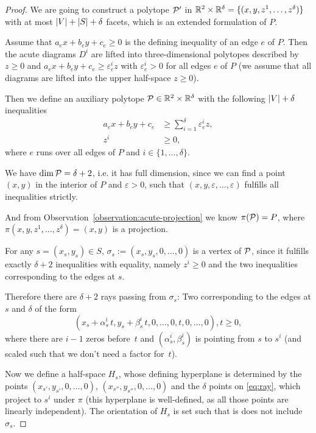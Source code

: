 \begin{proof}
  We are going to construct a polytope $\P'$ in $\R^2 \times \R^{\delta} = \{(x,y,z^1,\dots,z^{\delta})\}$ with at most $\abs{V}+\abs{S}+\delta$ facets, which is an extended formulation of $P$.

  Assume that $a_e x + b_e y + c_e \geq 0$ is the defining inequality of an edge $e$ of $P$. Then the acute diagrams $D^i$ are lifted into three-dimensional polytopes described by $z \geq 0$ and $a_e x + b_e y + c_e \geq \varepsilon_e^i z$ with $\varepsilon_e^i > 0$ for all edges $e$ of $P$ (we assume that all diagrams are lifted into the upper half-space $z \geq 0$).

  Then we define an auxiliary polytope $\P \in \R^2 \times \R^{\delta}$ with the following $\abs{V}+\delta$ inequalities 
  \begin{align*}
    a_e x + b_e y + c_e &\geq \sum_{i=1}^{\delta} \varepsilon_e^i z,\\
    z^i &\geq 0,
  \end{align*}
  where $e$ runs over all edges of $P$ and $i \in \{1,\dots,\delta\}$.

  We have $\dim \P = \delta + 2$, i.e. it has full dimension, since we can find a point $(x,y)$ in the interior of $P$ and $\varepsilon > 0$, such that $(x,y,\varepsilon,\dots,\varepsilon)$ fulfills all inequalities strictly.

  And from Observation~\ref{observation:acute-projection} we know $\pi(\P)=P$, where $\pi(x,y,z^1,\dots,z^{\delta}) = (x,y)$ is a projection.

  For any $s = (x_s, y_s) \in S$, $\sigma_s := (x_s,y_s,0,\dots,0)$ is a vertex of $\P$, since it fulfills exactly $\delta + 2$ inequalities with equality, namely $z^i \geq 0$ and the two inequalities corresponding to the edges at $s$.

  Therefore there are $\delta + 2$ rays passing from $\sigma_s$: Two corresponding to the edges at $s$ and $\delta$ of the form
  \begin{equation}\label{eq:ray}
    (x_s + \alpha_s^i\,t,y_s + \beta_s^i\,t,0,\dots,0,t,0,\dots,0), t \geq 0,
  \end{equation}
  where there are $i-1$ zeros before~$t$ and $(\alpha_s^i, \beta_s^i)$ is pointing from $s$ to $s^i$ (and scaled such that we don't need a factor for~$t$).

  Now we define a half-space $H_s$, whose defining hyperplane is determined by the points $(x_{s'},y_{s'},0,\dots,0)$, $(x_{s''},y_{s''},0,\dots,0)$ and the $\delta$ points on \eqref{eq:ray}, which project to $s^i$ under $\pi$ (this hyperplane is well-defined, as all those points are linearly independent). The orientation of $H_s$ is set such that is does not include $\sigma_s$.


\end{proof}
